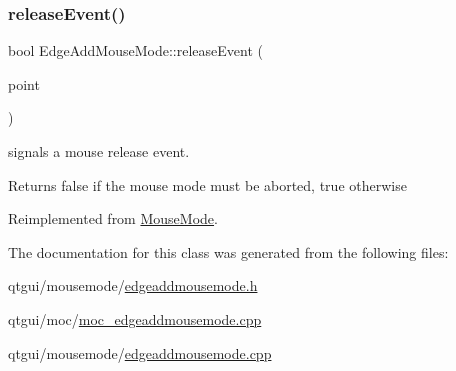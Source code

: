 \subsubsection{\texorpdfstring{releaseEvent()}{releaseEvent()}}
{\footnotesize\ttfamily bool Edge\+Add\+Mouse\+Mode\+::release\+Event (\begin{DoxyParamCaption}\item[{const Q\+PointF \&}]{point }\end{DoxyParamCaption})\hspace{0.3cm}{\ttfamily [virtual]}}



signals a mouse release event. 

\begin{DoxyReturn}{Returns}
false if the mouse mode must be aborted, true otherwise 
\end{DoxyReturn}


Reimplemented from \mbox{\hyperlink{class_mouse_mode_a9515661d7c29ab234b7e70d0fe7e5db0}{Mouse\+Mode}}.



The documentation for this class was generated from the following files\+:\begin{DoxyCompactItemize}
\item 
qtgui/mousemode/\mbox{\hyperlink{edgeaddmousemode_8h}{edgeaddmousemode.\+h}}\item 
qtgui/moc/\mbox{\hyperlink{moc__edgeaddmousemode_8cpp}{moc\+\_\+edgeaddmousemode.\+cpp}}\item 
qtgui/mousemode/\mbox{\hyperlink{edgeaddmousemode_8cpp}{edgeaddmousemode.\+cpp}}\end{DoxyCompactItemize}
